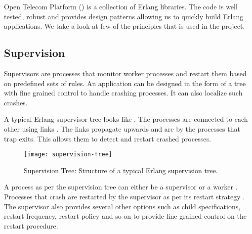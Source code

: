 Open Telecom Platform () is a collection of Erlang libraries.
The  code is
well tested, robust and provides design patterns allowing us to quickly build
Erlang applications. We take a look at few of the  principles
that is used in the project.

\subsection{Supervision}
\label{section:concepts.supervision}

Supervisors are processes that monitor worker processes and restart them based
on predefined sets of rules. An application can be designed in the form of a
tree with fine grained control to handle crashing processes. It can also
localize such crashes.

A typical Erlang supervisor tree looks like . The
processes are connected to each other using links%
. The links propagate upwards and are  by the processes that trap
exits. This allows them to detect and restart crashed processes.

\begin{figure}
  \texttt{[image: supervision-tree]}
  \caption[Supervision Tree]{%
    Supervision Tree: Structure of a typical Erlang supervision tree.}
  \label{figure:supervision.tree}
  \normalcaption
\end{figure}

A process as per the supervision tree can either be a supervisor%
or a worker%
. Processes that crash are restarted by the supervisor as per its
restart strategy%
. The supervisor also provides several other options such as child
specifications, restart frequency, restart policy and so on to provide
fine grained control on the restart procedure.

